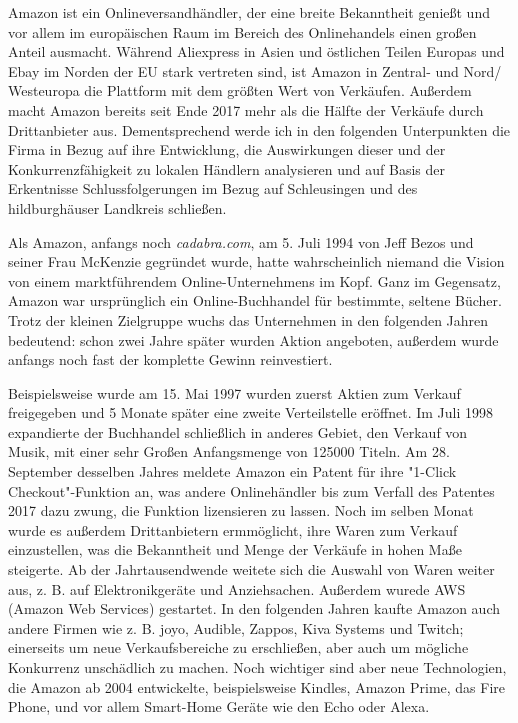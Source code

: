 Amazon ist ein Onlineversandhändler, der eine breite Bekanntheit genießt und vor allem im europäischen Raum im Bereich des Onlinehandels einen großen Anteil ausmacht. Während Aliexpress in Asien und östlichen Teilen Europas und Ebay im Norden der EU stark vertreten sind, ist Amazon in Zentral- und Nord/ Westeuropa die Plattform mit dem größten Wert von Verkäufen\cite[S. 22]{EuroCommerce}. Außerdem macht Amazon bereits seit Ende 2017 mehr als die Hälfte der Verkäufe durch Drittanbieter aus\cite[S. 25]{Haendlerbund}. Dementsprechend werde ich in den folgenden Unterpunkten die Firma in Bezug auf ihre Entwicklung, die Auswirkungen dieser und der Konkurrenzfähigkeit zu lokalen Händlern analysieren und auf Basis der Erkentnisse Schlussfolgerungen im Bezug auf Schleusingen und des hildburghäuser Landkreis schließen.

Als Amazon, anfangs noch \emph{cadabra.com}, am 5. Juli 1994 von Jeff Bezos und seiner Frau McKenzie gegründet wurde, hatte wahrscheinlich niemand die Vision von einem marktführendem Online-Unternehmens im Kopf. Ganz im Gegensatz, Amazon war ursprünglich ein Online-Buchhandel für bestimmte, seltene Bücher\cite[S. 17]{Graf}. Trotz der kleinen Zielgruppe wuchs das Unternehmen in den folgenden Jahren bedeutend: schon zwei Jahre später wurden Aktion angeboten, außerdem wurde anfangs noch fast der komplette Gewinn reinvestiert\cite{Rosoff}.


Beispielsweise wurde am 15. Mai 1997 wurden zuerst Aktien zum Verkauf freigegeben und 5 Monate später eine zweite Verteilstelle eröffnet. Im Juli 1998 expandierte der Buchhandel schließlich in anderes Gebiet, den Verkauf von Musik, mit einer sehr Großen Anfangsmenge von 125000 Titeln. 
Am 28. September desselben Jahres meldete Amazon ein Patent für ihre "1-Click Checkout"-Funktion an, was andere Onlinehändler bis zum Verfall des Patentes 2017 dazu zwung, die Funktion lizensieren zu lassen.
Noch im selben Monat wurde es außerdem Drittanbietern ermmöglicht, ihre Waren zum Verkauf einzustellen, was die Bekanntheit und Menge der Verkäufe in hohen Maße steigerte.
Ab der Jahrtausendwende weitete sich die Auswahl von Waren weiter aus, z. B. auf Elektronikgeräte und Anziehsachen. Außerdem wurede AWS (Amazon Web Services) gestartet.
In den folgenden Jahren kaufte Amazon auch andere Firmen wie z. B. joyo, Audible, Zappos, Kiva Systems und Twitch; einerseits um neue Verkaufsbereiche zu erschließen, aber auch um mögliche Konkurrenz unschädlich zu machen.
Noch wichtiger sind aber neue Technologien, die Amazon ab 2004 entwickelte, beispielsweise Kindles, Amazon Prime, das Fire Phone, und vor allem Smart-Home Geräte wie den Echo oder Alexa.

